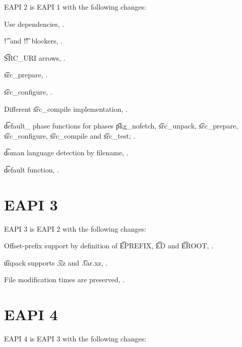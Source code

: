 EAPI 2 is EAPI 1 with the following changes:

\begin{compactitem}
\item Use dependencies, .
\item \t{!}\ and \t{!!}\ blockers, .
\item \t{SRC\_URI} arrows, .
\item \t{src\_prepare}, .
\item \t{src\_configure}, .
\item Different \t{src\_compile} implementation, .
\item \t{default\_} phase functions for phases \t{pkg\_nofetch}, \t{src\_unpack}, \t{src\_prepare},
    \t{src\_configure}, \t{src\_compile} and \t{src\_test}; .
\item \t{doman} language detection by filename, .
\item \t{default} function, .
\end{compactitem}

\section*{EAPI 3}

EAPI 3 is EAPI 2 with the following changes:
\begin{compactitem}
\item Offset-prefix support by definition of \t{EPREFIX}, \t{ED} and \t{EROOT},
    .
\item \t{unpack} supports \t{.xz} and \t{.tar.xz}, .
\item File modification times are preserved, .
\end{compactitem}

\section*{EAPI 4}

EAPI 4 is EAPI 3 with the following changes:

